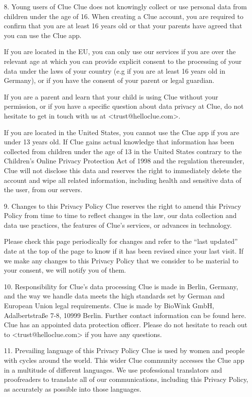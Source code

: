 8. Young users of Clue
Clue does not knowingly collect or use personal data from children under the age of 16. When creating a Clue account, you are required to confirm that you are at least 16 years old or that your parents have agreed that you can use the Clue app.

If you are located in the EU, you can only use our services if you are over the relevant age at which you can provide explicit consent to the processing of your data under the laws of your country (e.g if you are at least 16 years old in Germany), or if you have the consent of your parent or legal guardian.

If you are a parent and learn that your child is using Clue without your permission, or if you have a specific question about data privacy at Clue, do not hesitate to get in touch with us at <trust@helloclue.com>.

If you are located in the United States, you cannot use the Clue app if you are under 13 years old. If Clue gains actual knowledge that information has been collected from children under the age of 13 in the United States contrary to the Children’s Online Privacy Protection Act of 1998 and the regulation thereunder, Clue will not disclose this data and reserves the right to immediately delete the account and wipe all related information, including health and sensitive data of the user, from our servers.

9. Changes to this Privacy Policy
Clue reserves the right to amend this Privacy Policy from time to time to reflect changes in the law, our data collection and data use practices, the features of Clue’s services, or advances in technology.

Please check this page periodically for changes and refer to the “last updated” date at the top of the page to know if it has been revised since your last visit. If we make any changes to this Privacy Policy that we consider to be material to your consent, we will notify you of them.

10. Responsibility for Clue’s data processing
Clue is made in Berlin, Germany, and the way we handle data meets the high standards set by German and European Union legal requirements. Clue is made by BioWink GmbH, Adalbertstraße 7-8, 10999 Berlin. Further contact information can be found here. Clue has an appointed data protection officer. Please do not hesitate to reach out to <trust@helloclue.com> if you have any questions.

11. Prevailing language of this Privacy Policy
Clue is used by women and people with cycles around the world. This wider Clue community accesses the Clue app in a multitude of different languages. We use professional translators and proofreaders to translate all of our communications, including this Privacy Policy, as accurately as possible into those languages.

